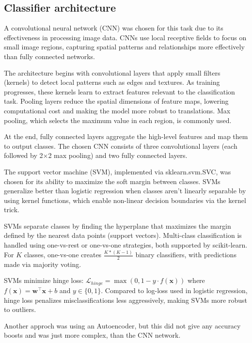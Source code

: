 \documentclass[a4, 10 pt, conference]{ieeeconf}  %
\begin{document}
\subsection{Classifier architecture}
\label{subsec:architecture}

A convolutional neural network (CNN) was chosen for this task due to its effectiveness in processing image data. CNNs use local receptive fields to focus on small image regions, capturing spatial patterns and relationships more effectively than fully connected networks.

The architecture begins with convolutional layers that apply small filters (kernels) to detect local patterns such as edges and textures. As training progresses, these kernels learn to extract features relevant to the classification task. Pooling layers reduce the spatial dimensions of feature maps, lowering computational cost and making the model more robust to translations. Max pooling, which selects the maximum value in each region, is commonly used.

At the end, fully connected layers aggregate the high-level features and map them to output classes. The chosen CNN consists of three convolutional layers (each followed by 2×2 max pooling) and two fully connected layers. 

The support vector machine (SVM), implemented via sklearn.svm.SVC, was chosen for its ability to maximize the soft margin between classes. SVMs generalize better than logistic regression when classes aren't linearly separable by using kernel functions, which enable non-linear decision boundaries via the kernel trick.

SVMs separate classes by finding the hyperplane that maximizes the margin defined by the nearest data points (support vectors). Multi-class classification is handled using one-vs-rest or one-vs-one strategies, both supported by scikit-learn. For $K$ classes, one-vs-one creates $\frac{K*(K-1)}{2}$ binary classifiers, with predictions made via majority voting.

SVMs minimize hinge loss: $\mathcal{L}_{hinge} = \max(0, 1 - y \cdot f(\mathbf{x})) $
where $f(\mathbf{x}) = \mathbf{w}^\top \mathbf{x} + b$ and $y \in \{0, 1\}$. Compared to log-loss used in logistic regression, hinge loss penalizes misclassifications less aggressively, making SVMs more robust to outliers.

Another approch was using an Autoencoder, but this did not give any accuracy boosts and was just more complex, than the CNN network.
\end{document}

